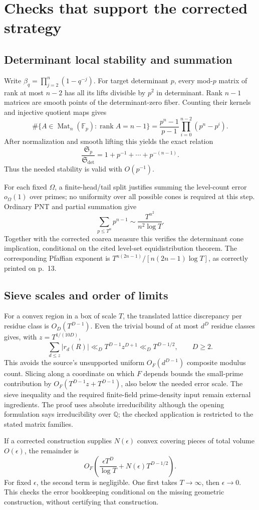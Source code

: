 \documentclass[10pt]{article}
\begin{document}
\section*{Checks that support the corrected strategy}
\subsection*{Determinant local stability and summation}
Write \(\beta_q=\prod_{j=2}^n(1-q^{-j})\). For target determinant \(p\), every mod-\(p\) matrix of rank at most \(n-2\) has all its lifts divisible by \(p^2\) in determinant. Rank \(n-1\) matrices are smooth points of the determinant-zero fiber. Counting their kernels and injective quotient maps gives \[\#\{A\in\operatorname{Mat}_n(\mathbb F_p):\operatorname{rank}A=n-1\}
 =\frac{p^n-1}{p-1}\prod_{i=0}^{n-2}(p^n-p^i).\] After normalization and smooth lifting this yields the exact relation \[\frac{\mathfrak S_p}{\mathfrak S_{\det}}
                   =1+p^{-1}+\cdots+p^{-(n-1)}.\] Thus the needed stability is valid with \(O(p^{-1})\).\par
For each fixed \(\Omega\), a finite-head/tail split justifies summing the level-count error \(o_\Omega(1)\) over primes; no uniformity over all possible cones is required at this step. Ordinary PNT and partial summation give \[\sum_{p\le T^n}p^{n-1}\sim\frac{T^{n^2}}{n^2\log T}.\] Together with the corrected coarea measure this verifies the determinant cone implication, conditional on the cited level-set equidistribution theorem. The corresponding Pfaffian exponent is \(T^{n(2n-1)}/[n(2n-1)\log T]\), as correctly printed on p. 13.\par
\subsection*{Sieve scales and order of limits}
For a convex region in a box of scale \(T\), the translated lattice discrepancy per residue class is \(O_D(T^{D-1})\). Even the trivial bound of at most \(d^D\) residue classes gives, with \(z=T^{1/(10D)}\), \[\sum_{d\le z}|r_d(R)|
   \ll_D T^{D-1}z^{D+1}
   \ll_D T^{D-1/2},\qquad D\ge2.\] This avoids the source’s unsupported uniform \(O_F(d^{D-1})\) composite modulus count. Slicing along a coordinate on which \(F\) depends bounds the small-prime contribution by \(O_F(T^{D-1}z+T^{D-1})\), also below the needed error scale. The sieve inequality and the required finite-field prime-density input remain external ingredients. The proof uses absolute irreducibility although the opening formulation says irreducibility over \(\mathbb Q\); the checked application is restricted to the stated matrix families.\par
If a corrected construction supplies \(N(\epsilon)\) convex covering pieces of total volume \(O(\epsilon)\), the remainder is \[O_F\!\left(\frac{\epsilon T^D}{\log T}
               +N(\epsilon)T^{D-1/2}\right).\] For fixed \(\epsilon\), the second term is negligible. One first takes \(T\to\infty\), then \(\epsilon\to0\). This checks the error bookkeeping conditional on the missing geometric construction, without certifying that construction.\par
\end{document}

